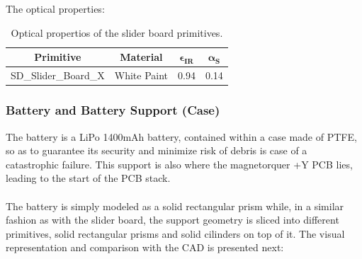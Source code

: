 The optical properties:

\begin{table}[H]
  \centering
  \begin{tabular}{@{}cccc@{}}
  \toprule
  \textbf{Primitive} & \textbf{Material} & $\mathbf{\epsilon_{IR}}$ & $\mathbf{\alpha_{S}}$ \\ \midrule
  SD\_Slider\_Board\_X  & White Paint       & 0.94                     & 0.14                  \\ \bottomrule
  \end{tabular}
  \caption{Optical propertios of the slider board primitives.}
  \end{table}

\subsubsection{Battery and Battery Support (Case)}
The battery is a LiPo 1400mAh battery, contained within a case made of PTFE, so as to guarantee its security and minimize risk of debris is case of
a catastrophic failure. This support is also where the magnetorquer +Y PCB lies, leading to the start of the PCB stack.

\paragraph{}
The battery is simply modeled as a solid rectangular prism while,
in a similar fashion as with the slider board, the support geometry is sliced into different primitives, solid rectangular
prisms and solid cilinders on top of it.  The visual representation and comparison with the CAD
is presented next: 

